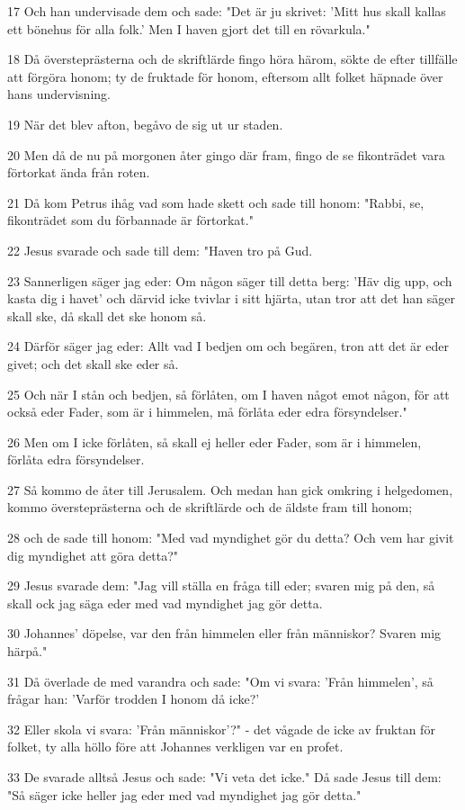 \par 17 Och han undervisade dem och sade: "Det är ju skrivet: 'Mitt hus skall kallas ett bönehus för alla folk.' Men I haven gjort det till en rövarkula."
\par 18 Då översteprästerna och de skriftlärde fingo höra härom, sökte de efter tillfälle att förgöra honom; ty de fruktade för honom, eftersom allt folket häpnade över hans undervisning.
\par 19 När det blev afton, begåvo de sig ut ur staden.
\par 20 Men då de nu på morgonen åter gingo där fram, fingo de se fikonträdet vara förtorkat ända från roten.
\par 21 Då kom Petrus ihåg vad som hade skett och sade till honom: "Rabbi, se, fikonträdet som du förbannade är förtorkat."
\par 22 Jesus svarade och sade till dem: "Haven tro på Gud.
\par 23 Sannerligen säger jag eder: Om någon säger till detta berg: 'Häv dig upp, och kasta dig i havet' och därvid icke tvivlar i sitt hjärta, utan tror att det han säger skall ske, då skall det ske honom så.
\par 24 Därför säger jag eder: Allt vad I bedjen om och begären, tron att det är eder givet; och det skall ske eder så.
\par 25 Och när I stån och bedjen, så förlåten, om I haven något emot någon, för att också eder Fader, som är i himmelen, må förlåta eder edra försyndelser."
\par 26 Men om I icke förlåten, så skall ej heller eder Fader, som är i himmelen, förlåta edra försyndelser.
\par 27 Så kommo de åter till Jerusalem. Och medan han gick omkring i helgedomen, kommo översteprästerna och de skriftlärde och de äldste fram till honom;
\par 28 och de sade till honom: "Med vad myndighet gör du detta? Och vem har givit dig myndighet att göra detta?"
\par 29 Jesus svarade dem: "Jag vill ställa en fråga till eder; svaren mig på den, så skall ock jag säga eder med vad myndighet jag gör detta.
\par 30 Johannes' döpelse, var den från himmelen eller från människor? Svaren mig härpå."
\par 31 Då överlade de med varandra och sade: "Om vi svara: 'Från himmelen', så frågar han: 'Varför trodden I honom då icke?'
\par 32 Eller skola vi svara: 'Från människor'?" - det vågade de icke av fruktan för folket, ty alla höllo före att Johannes verkligen var en profet.
\par 33 De svarade alltså Jesus och sade: "Vi veta det icke." Då sade Jesus till dem: "Så säger icke heller jag eder med vad myndighet jag gör detta."

